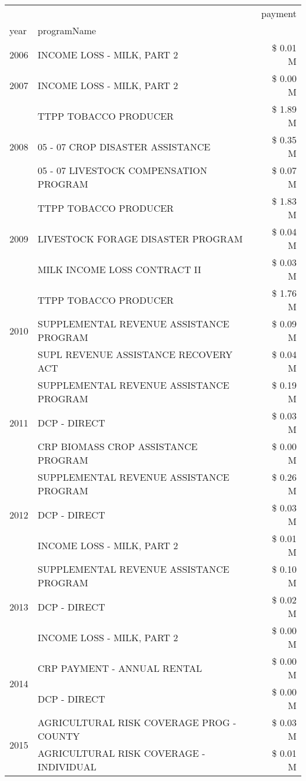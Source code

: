\begin{tabular}{llr}
\toprule
 &  & payment \\
year & programName &  \\
\midrule
2006 & INCOME LOSS - MILK, PART 2 & \$ 0.01 M \\
\cline{1-3}
2007 & INCOME LOSS - MILK, PART 2 & \$ 0.00 M \\
\cline{1-3}
\multirow[t]{3}{*}{2008} & TTPP TOBACCO PRODUCER & \$ 1.89 M \\
 & 05 - 07 CROP DISASTER ASSISTANCE & \$ 0.35 M \\
 & 05 - 07 LIVESTOCK COMPENSATION PROGRAM & \$ 0.07 M \\
\cline{1-3}
\multirow[t]{3}{*}{2009} & TTPP TOBACCO PRODUCER & \$ 1.83 M \\
 & LIVESTOCK FORAGE DISASTER  PROGRAM & \$ 0.04 M \\
 & MILK INCOME LOSS CONTRACT II & \$ 0.03 M \\
\cline{1-3}
\multirow[t]{3}{*}{2010} & TTPP TOBACCO PRODUCER & \$ 1.76 M \\
 & SUPPLEMENTAL REVENUE ASSISTANCE PROGRAM & \$ 0.09 M \\
 & SUPL REVENUE ASSISTANCE RECOVERY ACT & \$ 0.04 M \\
\cline{1-3}
\multirow[t]{3}{*}{2011} & SUPPLEMENTAL REVENUE ASSISTANCE PROGRAM & \$ 0.19 M \\
 & DCP - DIRECT & \$ 0.03 M \\
 & CRP BIOMASS CROP ASSISTANCE PROGRAM & \$ 0.00 M \\
\cline{1-3}
\multirow[t]{3}{*}{2012} & SUPPLEMENTAL REVENUE ASSISTANCE PROGRAM & \$ 0.26 M \\
 & DCP - DIRECT & \$ 0.03 M \\
 & INCOME LOSS - MILK, PART 2 & \$ 0.01 M \\
\cline{1-3}
\multirow[t]{3}{*}{2013} & SUPPLEMENTAL REVENUE ASSISTANCE PROGRAM & \$ 0.10 M \\
 & DCP - DIRECT & \$ 0.02 M \\
 & INCOME LOSS - MILK, PART 2 & \$ 0.00 M \\
\cline{1-3}
\multirow[t]{2}{*}{2014} & CRP PAYMENT - ANNUAL RENTAL & \$ 0.00 M \\
 & DCP - DIRECT & \$ 0.00 M \\
\cline{1-3}
\multirow[t]{3}{*}{2015} & AGRICULTURAL RISK COVERAGE PROG - COUNTY & \$ 0.03 M \\
 & AGRICULTURAL RISK COVERAGE - INDIVIDUAL & \$ 0.01 M \\

\end{tabular}
